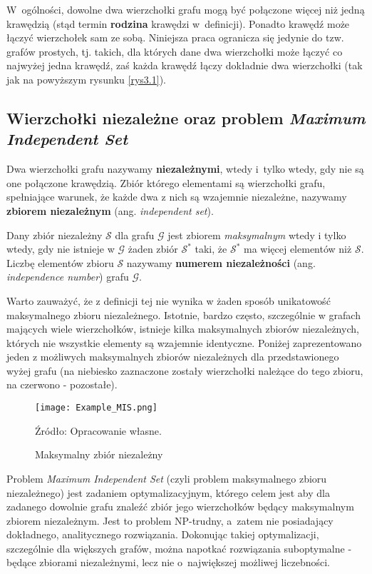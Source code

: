 \documentclass[12pt,a4paper,twoside,openany]{book}
\begin{document}
W~ogólności, dowolne dwa wierzchołki grafu mogą być połączone więcej niż jedną krawędzią (stąd termin \textbf{rodzina} krawędzi w~definicji).
Ponadto krawędź może łączyć wierzchołek sam ze sobą. 
Niniejsza praca ogranicza się jedynie do tzw. grafów prostych, tj. takich, dla których dane dwa wierzchołki może łączyć co najwyżej jedna krawędź, zaś każda krawędź łączy dokładnie dwa wierzchołki (tak jak na powyższym rysunku \ref{rys3.1}).

\subsection{Wierzchołki niezależne oraz problem \textit{Maximum Independent Set}}

Dwa wierzchołki grafu nazywamy \textbf{niezależnymi}, wtedy i~tylko wtedy, gdy nie są one połączone krawędzią.
Zbiór którego elementami są wierzchołki grafu, spełniające warunek, że każde dwa z nich są wzajemnie niezależne, nazywamy \textbf{zbiorem niezależnym} (ang. \textit{independent set})\cite{}.

Dany zbiór niezależny $\mathcal{S}$ dla grafu $\mathcal{G}$ jest zbiorem \textit{maksymalnym} wtedy i tylko wtedy, gdy nie istnieje w $\mathcal{G}$ żaden zbiór $\mathcal{S}^*$ taki, że $\mathcal{S}^*$ ma więcej elementów niż $\mathcal{S}$.
Liczbę elementów zbioru $\mathcal{S}$ nazywamy \textbf{numerem niezależności} (ang. \textit{independence number}) grafu $\mathcal{G}$.

Warto zauważyć, że z definicji tej nie wynika w żaden sposób unikatowość maksymalnego zbioru niezależnego. 
Istotnie, bardzo często, szczególnie w grafach mających wiele wierzchołków, istnieje kilka maksymalnych zbiorów niezależnych, których nie wszystkie elementy są wzajemnie identyczne. 
Poniżej zaprezentowano jeden z możliwych maksymalnych zbiorów niezależnych dla przedstawionego wyżej grafu (na niebiesko zaznaczone zostały wierzchołki należące do tego zbioru, na czerwono - pozostałe).

\begin{figure}[h]
\centering 
\caption{Maksymalny zbiór niezależny} 
\label{rys3.2} 
\vskip0.1cm
\texttt{[image: Example\_MIS.png]}
\centerline{\scriptsize Źródło: Opracowanie własne.}
\end{figure}

Problem \textit{Maximum Independent Set} (czyli problem maksymalnego zbioru niezależnego) jest zadaniem optymalizacyjnym, którego celem jest aby dla zadanego dowolnie grafu znaleźć zbiór jego wierzchołków będący maksymalnym zbiorem niezależnym. 
Jest to problem NP-trudny, a~zatem nie posiadający dokładnego, analitycznego rozwiązania. 
Dokonując takiej optymalizacji, szczególnie dla większych grafów, można napotkać rozwiązania suboptymalne - będące zbiorami niezależnymi, lecz nie o~największej możliwej liczebności.
\end{document}
